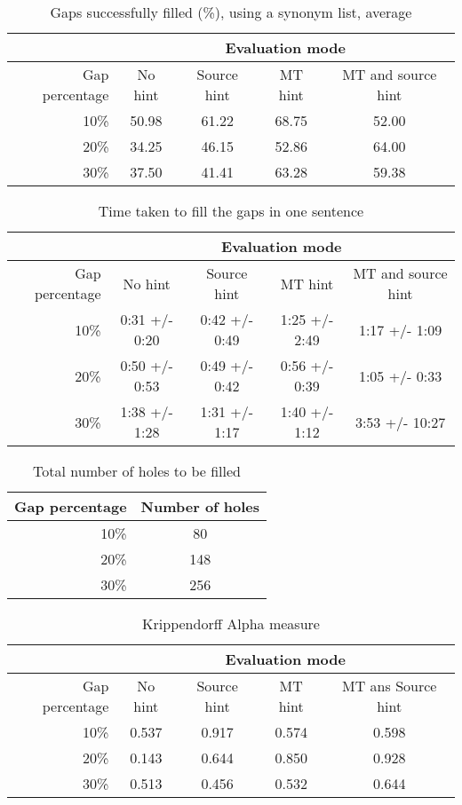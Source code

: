 \documentclass[11pt, oneside]{article}   	%
\begin{document}
\begin{table}[H]
\centering
\begin{tabular}{|r |*{4}{c}|}
\hline
 &\multicolumn{4}{c|}{Evaluation mode}\\
\hline
Gap percentage & No hint & Source hint & MT hint & MT and source hint\\
\hline
10\%&50.98&61.22&68.75&52.00\\
20\%&34.25&46.15&52.86&64.00\\
30\%&37.50&41.41&63.28&59.38\\
\hline
\end{tabular}
\caption {Gaps successfully filled (\%), using a synonym list, average} \label{tab:title} 
\end{table}

\begin{table}[H]
\centering
\begin{tabular}{|r |*{4}{c}|}
\hline
 &\multicolumn{4}{c|}{Evaluation mode}\\
\hline
Gap percentage & No hint & Source hint & MT hint & MT and source hint\\
\hline
10\%&0:31 +/- 0:20&0:42 +/- 0:49&1:25 +/- 2:49&1:17 +/- 1:09\\
20\%&0:50 +/- 0:53&0:49 +/- 0:42&0:56 +/- 0:39&1:05 +/- 0:33\\
30\%&1:38 +/- 1:28&1:31 +/- 1:17&1:40 +/- 1:12&3:53 +/- 10:27\\
\hline
\end{tabular}
\caption {Time taken to fill the gaps in one sentence} \label{tab:title} 
\end{table}

\begin{table}[H]
\centering
\begin{tabular}{|r |*{1}{c}|}
\hline
Gap percentage & Number of holes\\
\hline
10\%&80\\
20\%&148\\
30\%&256\\
\hline
\end{tabular}
\caption {Total number of holes to be filled} \label{tab:title}
\end{table}

\begin{table}[H]
\centering
\begin{tabular}{|r |*{4}{c}|}
\hline
 &\multicolumn{4}{c|}{Evaluation mode}\\
\hline
Gap percentage & No hint & Source hint & MT hint & MT ans Source hint\\
\hline
10\%&0.537 &0.917 &0.574 &0.598\\
20\%&0.143 &0.644 &0.850 &0.928\\
30\%&0.513 &0.456 &0.532 &0.644\\
\hline
\end{tabular}
\caption {Krippendorff Alpha measure} \label{tab:title}
\end{table}
\end{document}
